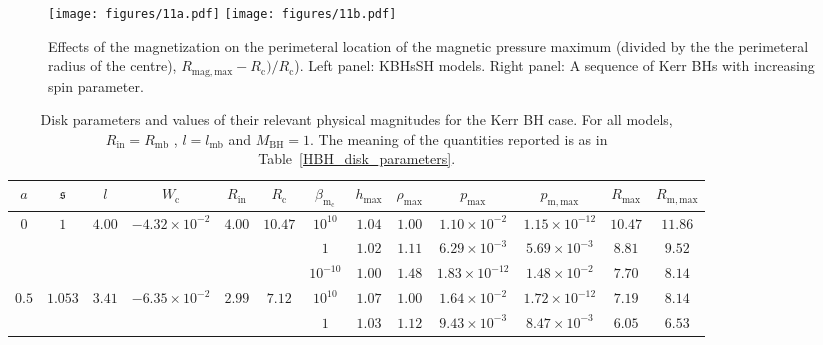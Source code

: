 \documentclass[twocolumn,aps,showpacs,showkeys,prd,superscriptaddress,byrevtex, amsmath]{revtex4-1}
\begin{document}
\begin{figure*}
\centering
\texttt{[image: figures/11a.pdf]}
\hspace{0.5cm}
\texttt{[image: figures/11b.pdf]}
\hspace{0.5cm}
\caption{Effects of the magnetization on the perimeteral location of the magnetic pressure maximum (divided by the the perimeteral radius of the centre), $R_{\mathrm{mag}, \mathrm{max}} - R_{\mathrm{c}})/ R_{\mathrm{c}}$). Left panel: KBHsSH models. Right panel: A sequence of Kerr BHs with increasing spin parameter.}
\label{comparison_HBH_Kerr_r_m_max}
\end{figure*}


\begin{table*}[t]
\caption{Disk parameters and values of their relevant physical magnitudes for the Kerr BH case. For all models, $R_{\mathrm{in}} = R_{\mathrm{mb}}$ , $l = l_{\mathrm{mb}}$ and $M_{\mathrm{BH}} = 1$. The meaning of the quantities reported is as in Table~\ref{HBH_disk_parameters}.}        
\label{KBH_disk_parameters}      
\centering          
\begin{tabular}{c c c c c c  c c c c c c c}
\hline\hline       
 $a$ & $\mathfrak{s}$ &  $l$ & $W_{\mathrm{c}}$ & $R_{\mathrm{in}}$ & $R_{\mathrm{c}}$ &  $\beta_{\mathrm{m_{\mathrm{c}}}}$ & $h_{\mathrm{max}}$ & $\rho_{\mathrm{max}}$ & $p_{\mathrm{max}}$ & $p_{\mathrm{m, max}}$ & $R_{\mathrm{max}}$ & $R_{\mathrm{m, max}}$\\ 
\hline           
$0$ & $1$ & $4.00$ & $-4.32 \times 10^{-2}$ & $4.00$ & $10.47$ & $10^{10}$ & $1.04$ & $1.00$ & $1.10 \times 10^{-2}$ & $1.15 \times 10^{-12}$ & $10.47$ & $11.86$\\ 

 &  &  &  &  &  & $1$ & $1.02$ & $1.11$ & $6.29 \times 10^{-3}$ & $5.69 \times 10^{-3}$ & $8.81$ & $9.52$\\ 

 &  &  & &  &  & $10^{-10}$ & $1.00$ & $1.48$ & $1.83 \times 10^{-12}$ & $1.48 \times 10^{-2}$ & $7.70$ & $8.14$\\ 

 $0.5$ & $1.053$ & $3.41$ & $-6.35 \times 10^{-2}$ & $2.99$ & $7.12$ & $10^{10}$ & $1.07$ & $1.00$ & $1.64 \times 10^{-2}$ & $1.72 \times 10^{-12}$ & $7.19$ & $8.14$\\ 

 &  &  & &  &  & $1$ & $1.03$ & $1.12$ & $9.43 \times 10^{-3}$ & $8.47 \times 10^{-3}$ & $6.05$ & $6.53$ \\ 
 

\end{tabular}
\end{table*}
\end{document}

